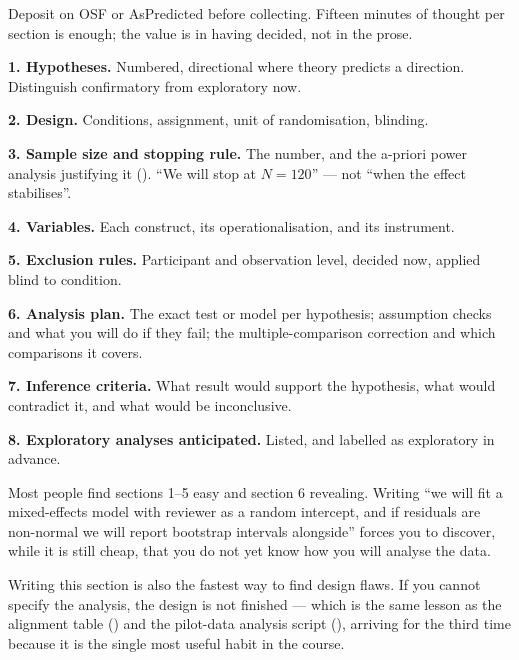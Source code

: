 \begin{templatebox}
Deposit on OSF or AsPredicted before collecting. Fifteen minutes of thought per
section is enough; the value is in having decided, not in the prose.

\medskip
\textbf{1. Hypotheses.} Numbered, directional where theory predicts a
direction. Distinguish confirmatory from exploratory now.

\noindent\textbf{2. Design.} Conditions, assignment, unit of randomisation,
blinding.

\noindent\textbf{3. Sample size and stopping rule.} The number, and the
a-priori power analysis justifying it (). ``We will stop at
$N=120$'' --- not ``when the effect stabilises''.

\noindent\textbf{4. Variables.} Each construct, its operationalisation, and its
instrument.

\noindent\textbf{5. Exclusion rules.} Participant and observation level,
decided now, applied blind to condition.

\noindent\textbf{6. Analysis plan.} The exact test or model per hypothesis;
assumption checks and what you will do if they fail; the multiple-comparison
correction and which comparisons it covers.

\noindent\textbf{7. Inference criteria.} What result would support the
hypothesis, what would contradict it, and what would be inconclusive.

\noindent\textbf{8. Exploratory analyses anticipated.} Listed, and labelled as
exploratory in advance.
\end{templatebox}

\begin{conceptbox}
Most people find sections 1--5 easy and section 6 revealing. Writing ``we will
fit a mixed-effects model with reviewer as a random intercept, and if residuals
are non-normal we will report bootstrap intervals alongside'' forces you to
discover, while it is still cheap, that you do not yet know how you will
analyse the data.

\medskip
Writing this section is also the fastest way to find design flaws. If you cannot
specify the analysis, the design is not finished --- which is the same lesson
as the alignment table () and the pilot-data analysis script
(), arriving for the third time because it is the single
most useful habit in the course.
\end{conceptbox}


